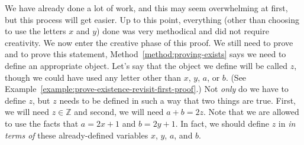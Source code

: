\documentclass{book}
\theoremstyle{ekimcustom}
\begin{document}
We have already done a lot of work, and this may seem overwhelming at first, but this process will get easier. Up to this point, everything (other than choosing to use the letters $x$ and $y$) done was very methodical and did not require creativity. We now enter the creative phase of this proof. We still need to prove  and to prove this statement, Method~\ref{method:proving-exists} says we need to define an appropriate object. Let's say that the object we define will be called $z$, though we could have used any letter other than $x$, $y$, $a$, or $b$. (See Example~\ref{example:prove-existence-revisit-first-proof}.) Not \emph{only} do we have to define $z$, but $z$ needs to be defined in such a way that two things are true. First, we will need $z \in \mathbb{Z}$ and second, we will need $a+b=2z$. Note that we are allowed to use the facts that $a=2x+1$ and $b=2y+1$. In fact, we should define $z$ in \emph{in terms of} these already-defined variables $x$, $y$, $a$, and $b$.
\end{document}
